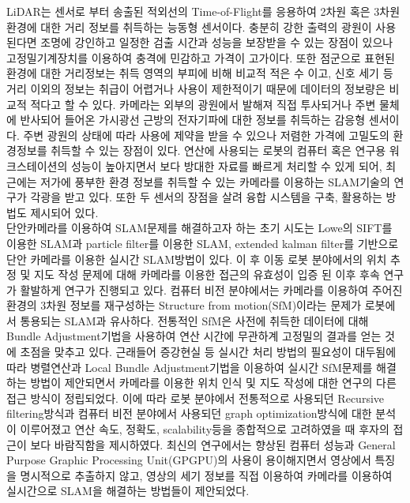 \documentclass[master,korean,final]{cbnu-ecs}
\begin{document}
LiDAR는 센서로 부터 송출된 적외선의 Time-of-Flight를 응용하여 2차원 혹은 3차원 환경에 대한 거리 정보를 취득하는 능동형 센서이다. 충분히 강한 출력의 광원이 사용된다면 조명에 강인하고 일정한 검출 시간과 성능을 보장받을 수 있는 장점이 있으나 고정밀기계장치를 이용하여 충격에 민감하고 가격이 고가이다. 또한 점군으로 표현된 환경에 대한 거리정보는 취득 영역의 부피에 비해 비교적 적은 수 이고, 신호 세기 등 거리 이외의 정보는 취급이 어렵거나 사용이 제한적이기 때문에 데이터의 정보량은 비교적 적다고 할 수 있다. 카메라는 외부의 광원에서 발해져 직접 투사되거나 주변 물체에 반사되어 들어온 가시광선 근방의 전자기파에 대한 정보를 취득하는 감응형 센서이다. 주변 광원의 상태에 따라 사용에 제약을 받을 수 있으나 저렴한 가격에 고밀도의 환경정보를 취득할 수 있는 장점이 있다. 연산에 사용되는 로봇의 컴퓨터 혹은 연구용 워크스테이션의 성능이 높아지면서 보다 방대한 자료를 빠르게 처리할 수 있게 되어, 최근에는 저가에 풍부한 환경 정보를 취득할 수 있는 카메라를 이용하는 SLAM기술의 연구가 각광을 받고 있다. 또한 두 센서의 장점을 살려 융합 시스템을 구축, 활용하는 방법도 제시되어 있다\cite{Newman2006}.\\
단안카메라를 이용하여 SLAM문제를 해결하고자 하는 초기 시도는 Lowe의 SIFT를 이용한 SLAM\cite{Se2005}과 particle filter를 이용한 SLAM\cite{Eade2006}, extended kalman filter를 기반으로 단안 카메라를 이용한 실시간 SLAM방법\cite{Davison2007}이 있다. 이 후 이동 로봇 분야에서의 위치 추정 및 지도 작성 문제에 대해 카메라를 이용한 접근의 유효성이 입증 된 이후 후속 연구가 활발하게 연구가 진행되고 있다. 컴퓨터 비전 분야에서는 카메라를 이용하여 주어진 환경의 3차원 정보를 재구성하는 Structure from motion(SfM)이라는 문제가 로봇에서 통용되는 SLAM과 유사하다. 전통적인 SfM은 사전에 취득한 데이터에 대해 Bundle Adjustment\cite{Triggs2000}기법을 사용하여 연산 시간에 무관하계 고정밀의 결과를 얻는 것에 초점을 맞추고 있다. 근래들어 증강현실 등 실시간 처리 방법의 필요성이 대두됨에 따라 병렬연산과 Local Bundle Adjustment기법을 이용하여 실시간 SfM문제를 해결하는 방법\cite{Klein2007}이 제안되면서 카메라를 이용한 위치 인식 및 지도 작성에 대한 연구의 다른 접근 방식이 정립되었다. 이에 따라 로봇 분야에서 전통적으로 사용되던 Recursive filtering방식과 컴퓨터 비전 분야에서 사용되던 graph optimization방식에 대한 분석\cite{Strasdat2010}이 이루어졌고 연산 속도, 정확도, scalability등을 종합적으로 고려하였을 때 후자의 접근이 보다 바람직함을 제시하였다. 최신의 연구에서는 향상된 컴퓨터 성능과 General Purpose Graphic Processing Unit(GPGPU)의 사용이 용이해지면서 영상에서 특징을 명시적으로 추출하지 않고, 영상의 세기 정보를 직접 이용하여 카메라를 이용하여 실시간으로 SLAM을 해결하는 방법들이 제안되었다\cite{Forster2014b,Engel2014}.\\
\end{document}
